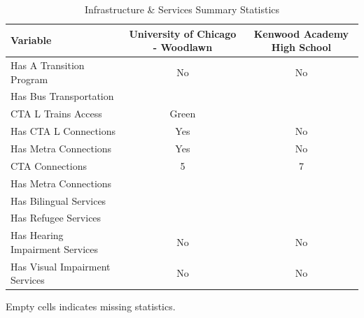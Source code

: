 \begin{table}[H]
\renewcommand{\arraystretch}{1.5}
\caption*{
{\large Infrastructure \& Services Summary Statistics}
} 

\fontsize{10pt}{11pt}\selectfont

\begin{tabular*}{\linewidth}{@{\extracolsep{\fill}}lcc}
\toprule
Variable & University of Chicago - Woodlawn & Kenwood Academy High School \\ 
\midrule\addlinespace[2.5pt]
Has A Transition Program & No & No \\
Has Bus Transportation &  &  \\
CTA L Trains Access & Green &  \\
Has CTA L Connections & Yes & No \\
Has Metra Connections & Yes & No \\
CTA Connections & 5 & 7 \\
Has Metra Connections &  &  \\
Has Bilingual Services &  &  \\
Has Refugee Services &  &  \\
Has Hearing Impairment Services & No & No \\
Has Visual Impairment Services & No & No \\
\bottomrule
\end{tabular*}
\begin{minipage}{\linewidth}
Empty cells indicates missing statistics.\\
\end{minipage}
\end{table}
